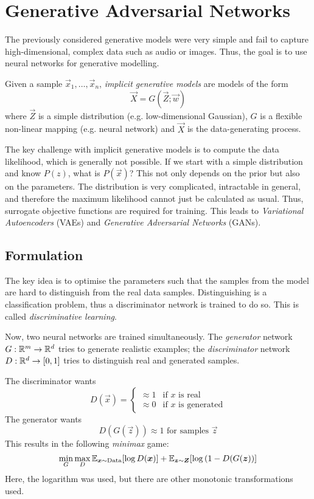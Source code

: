 \section{Generative Adversarial Networks}
The previously considered generative models
were very simple and fail to capture high-dimensional,
complex data such as audio or images.
Thus, the goal is to use neural networks
for generative modelling.

Given a sample $\vec{x}_1, \dotsc, \vec{x}_n$,
\emph{implicit generative models} are models
of the form
\begin{equation*}
\vec{X} = G(\vec{Z}; \vec{w})
\end{equation*}
where $\vec{Z}$ is a simple distribution
(e.g. low-dimensional Gaussian),
$G$ is a flexible non-linear mapping
(e.g. neural network)
and $\vec{X}$ is the data-generating process.

The key challenge with implicit generative models
is to compute the data likelihood,
which is generally not possible.
If we start with a simple distribution
and know $P(z)$, what is $P(\vec{x})$?
This not only depends on the prior but
also on the parameters.
The distribution is very complicated,
intractable in general,
and therefore the maximum likelihood
cannot just be calculated as usual.
Thus, surrogate objective functions
are required for training.
This leads to
\emph{Variational Autoencoders} (VAEs)
and \emph{Generative Adversarial Networks} (GANs).

\subsection{Formulation}
The key idea is to optimise the parameters
such that the samples from the model are
hard to distinguish from the real data samples.
Distinguishing is a classification problem,
thus a discriminator network is trained to do so.
This is called \emph{discriminative learning}.

Now, two neural networks are trained simultaneously.
The \emph{generator} network $G : \mathbb{R}^m \to \mathbb{R}^d$
tries to generate realistic examples;
the \emph{discriminator} network
$D : \mathbb{R}^d \to [0, 1]$
tries to distinguish real and generated samples.

The discriminator wants
\begin{equation*}
D(\vec{x}) =
\begin{cases}
\approx 1 & \text{if $x$ is real} \\
\approx 0 & \text{if $x$ is generated}
\end{cases}
\end{equation*}
The generator wants
\begin{equation*}
D(G(\vec{z})) \approx 1 \text{ for samples $\vec{z}$}
\end{equation*}
This results in the following \emph{minimax} game:
\begin{equation*}
\min_G{\max_D{
		\mathbb{E}_{\boldsymbol{x} \sim \text{Data}}[\log{D(\boldsymbol{x})}]
		+
		\mathbb{E}_{\boldsymbol{z} \sim \boldsymbol{Z}}[\log{(1 - D(G(\boldsymbol{z}))}]
}}
\end{equation*}
Here, the logarithm was used,
but there are other monotonic
transformations used.


